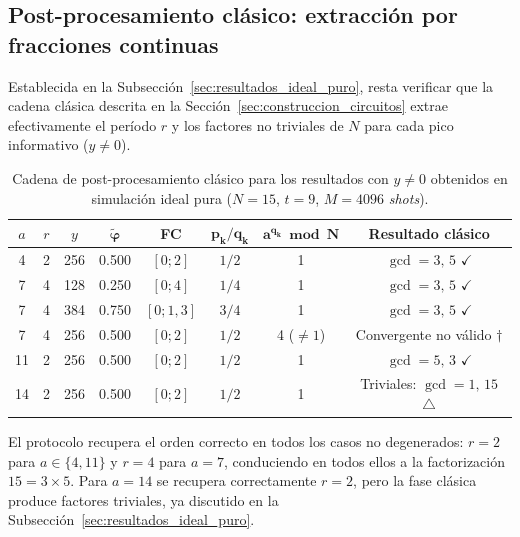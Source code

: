 \documentclass[12pt, spanish]{book}
\begin{document}
\subsection{Post-procesamiento clásico: extracción por fracciones continuas}
\label{sec:resultados_fracciones}

Establecida en la Subsección~\ref{sec:resultados_ideal_puro}, resta verificar que la cadena clásica descrita en la Sección~\ref{sec:construccion_circuitos} extrae efectivamente el período $r$ y los factores no triviales de $N$ para cada pico informativo ($y \neq 0$).

\begin{table}[H]
    \centering
    \caption{Cadena de post-procesamiento clásico para los 
    resultados con $y \neq 0$ obtenidos en simulación ideal pura 
    ($N = 15$, $t = 9$, $M = 4096$ \textit{shots}).\\}
    \label{tab:fracciones_continuas}
    \small
    \begin{tabular}{cccccccc}
        \hline
        \textbf{$a$} & \textbf{$r$} & \textbf{$y$} & 
        $\boldsymbol{\tilde{\varphi}}$ & \textbf{FC} & 
        $\boldsymbol{p_k/q_k}$ & $\boldsymbol{a^{q_k} \bmod N}$ & 
        \textbf{Resultado clásico} \\
        \hline
        4  & 2 & 256 & 0.500 & $[0; 2]$    & $1/2$ & 1           & $\gcd = 3,\, 5$ \quad $\checkmark$  \\
        7  & 4 & 128 & 0.250 & $[0; 4]$    & $1/4$ & 1           & $\gcd = 3,\, 5$ \quad $\checkmark$  \\
        7  & 4 & 384 & 0.750 & $[0; 1, 3]$ & $3/4$ & 1           & $\gcd = 3,\, 5$ \quad $\checkmark$  \\
        7  & 4 & 256 & 0.500 & $[0; 2]$    & $1/2$ & 4 ($\neq 1$) & Convergente no válido \quad $\dagger$ \\
        11 & 2 & 256 & 0.500 & $[0; 2]$    & $1/2$ & 1           & $\gcd = 5,\, 3$ \quad $\checkmark$  \\
        14 & 2 & 256 & 0.500 & $[0; 2]$    & $1/2$ & 1           & Triviales: $\gcd = 1,\, 15$ \quad $\triangle$ \\
        \hline
    \end{tabular}
\end{table}

El protocolo recupera el orden correcto en todos los casos no degenerados: $r = 2$ para $a \in \{4, 11\}$ y $r = 4$ para $a = 7$, conduciendo en todos ellos a la factorización $15 = 3 \times 5$. Para $a = 14$ se recupera correctamente $r = 2$, pero la fase clásica produce factores triviales, ya discutido en la Subsección~\ref{sec:resultados_ideal_puro}.\\
\end{document}
